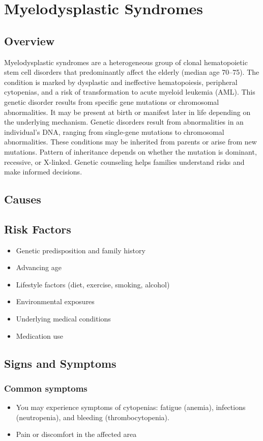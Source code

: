 \chapter{Myelodysplastic Syndromes}
\label{sec:Myelodysplastic Syndromes}

\section{Overview}
Myelodysplastic syndromes are a heterogeneous group of clonal hematopoietic stem cell disorders that predominantly affect the elderly (median age 70--75). The condition is marked by dysplastic and ineffective hematopoiesis, peripheral cytopenias, and a risk of transformation to acute myeloid leukemia (AML). This genetic disorder results from specific gene mutations or chromosomal abnormalities. It may be present at birth or manifest later in life depending on the underlying mechanism. Genetic disorders result from abnormalities in an individual's DNA, ranging from single-gene mutations to chromosomal abnormalities. These conditions may be inherited from parents or arise from new mutations. Pattern of inheritance depends on whether the mutation is dominant, recessive, or X-linked. Genetic counseling helps families understand risks and make informed decisions.
\section{Causes}
\section{Risk Factors}

\begin{itemize}[noitemsep]
  \item Genetic predisposition and family history
  \item Advancing age
  \item Lifestyle factors (diet, exercise, smoking, alcohol)
  \item Environmental exposures
  \item Underlying medical conditions
  \item Medication use
\end{itemize}
\section{Signs and Symptoms}

\subsection{Common symptoms}
\begin{itemize}[noitemsep]
  \item You may experience symptoms of cytopenias: fatigue (anemia), infections (neutropenia), and bleeding (thrombocytopenia).

  \item Pain or discomfort in the affected area
  \end{itemize}

